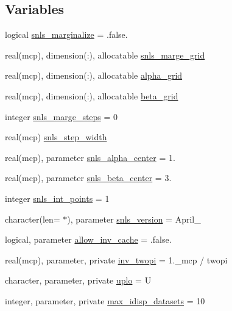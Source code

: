 \subsection*{Variables}
\begin{DoxyCompactItemize}
\item 
logical \mbox{\hyperlink{namespacesnls_a06db14b2b9d3e226db5ba7a2a90617de}{snls\+\_\+marginalize}} = .false.
\item 
real(mcp), dimension(\+:), allocatable \mbox{\hyperlink{namespacesnls_a0314289992414e577228e51eb768cb77}{snls\+\_\+marge\+\_\+grid}}
\item 
real(mcp), dimension(\+:), allocatable \mbox{\hyperlink{namespacesnls_ac4adeb5ed9cc6b1ff8d81eb5c3f7614f}{alpha\+\_\+grid}}
\item 
real(mcp), dimension(\+:), allocatable \mbox{\hyperlink{namespacesnls_a56411cdf57a0e9358f977a9dc70b1715}{beta\+\_\+grid}}
\item 
integer \mbox{\hyperlink{namespacesnls_ad2d9ca2fa23ca065ff997f4b15114c53}{snls\+\_\+marge\+\_\+steps}} = 0
\item 
real(mcp) \mbox{\hyperlink{namespacesnls_a3a7f05d5e17b5868642de17a8d101626}{snls\+\_\+step\+\_\+width}}
\item 
real(mcp), parameter \mbox{\hyperlink{namespacesnls_a153b2cafcd96b5cf2ea20c31595180a0}{snls\+\_\+alpha\+\_\+center}} = 1.
\item 
real(mcp), parameter \mbox{\hyperlink{namespacesnls_a82f9e1a099b4e59c715b4fef3c8171cc}{snls\+\_\+beta\+\_\+center}} = 3.
\item 
integer \mbox{\hyperlink{namespacesnls_acf460aba70488a6ee73c575ab0e9d865}{snls\+\_\+int\+\_\+points}} = 1
\item 
character(len= $\ast$), parameter \mbox{\hyperlink{namespacesnls_a919a8bb686436d27901e5de9a8880f26}{snls\+\_\+version}} = \textquotesingle{}April\+\_\textquotesingle{}
\item 
logical, parameter \mbox{\hyperlink{namespacesnls_a8df88425e6d587341a52687ef62d81ae}{allow\+\_\+inv\+\_\+cache}} = .false.
\item 
real(mcp), parameter, private \mbox{\hyperlink{namespacesnls_af91b609e54e5ac91712f0bb5303b5652}{inv\+\_\+twopi}} = 1.\+\_\+mcp / twopi
\item 
character, parameter, private \mbox{\hyperlink{namespacesnls_a770d0a9cd7d82539ec94f8d27bb13c53}{uplo}} = \textquotesingle{}U\textquotesingle{}
\item 
integer, parameter, private \mbox{\hyperlink{namespacesnls_a82d4a9b322c284cf9bba27e6c86cb4f9}{max\+\_\+idisp\+\_\+datasets}} = 10

\end{DoxyCompactItemize}
